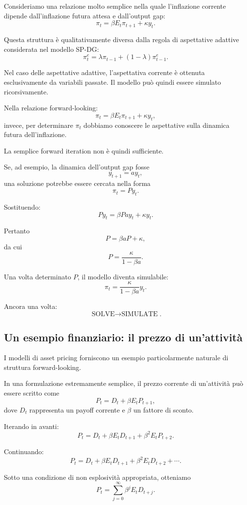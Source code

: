 \documentclass{book}
\begin{document}
Consideriamo una relazione molto semplice nella quale l'inflazione
corrente dipende dall'inflazione futura attesa e dall'output gap:
\[
\pi_t
=
\beta E_t\pi_{t+1}
+
\kappa y_t.
\]

Questa struttura è qualitativamente diversa dalla regola di aspettative
adattive considerata nel modello SP-DG:
\[
\pi_t^e
=
\lambda\pi_{t-1}
+
(1-\lambda)\pi_{t-1}^e.
\]

Nel caso delle aspettative adattive, l'aspettativa corrente è ottenuta
esclusivamente da variabili passate. Il modello può quindi essere
simulato ricorsivamente.

Nella relazione forward-looking:
\[
\pi_t
=
\beta E_t\pi_{t+1}
+
\kappa y_t,
\]
invece, per determinare $\pi_t$ dobbiamo conoscere le aspettative sulla
dinamica futura dell'inflazione.

La semplice forward iteration non è quindi sufficiente.

Se, ad esempio, la dinamica dell'output gap fosse
\[
y_{t+1}=a y_t,
\]
una soluzione potrebbe essere cercata nella forma
\[
\pi_t=P y_t.
\]

Sostituendo:
\[
P y_t
=
\beta P a y_t
+
\kappa y_t.
\]

Pertanto
\[
P
=
\beta aP+\kappa,
\]
da cui
\[
P
=
\frac{\kappa}{1-\beta a}.
\]

Una volta determinato $P$, il modello diventa simulabile:
\[
\pi_t
=
\frac{\kappa}{1-\beta a}y_t.
\]

Ancora una volta:
\[
\boxed{
\text{SOLVE}
\longrightarrow
\text{SIMULATE}
}.
\]


\subsection{Un esempio finanziario: il prezzo di un'attività}

I modelli di asset pricing forniscono un esempio particolarmente naturale
di struttura forward-looking.

In una formulazione estremamente semplice, il prezzo corrente di
un'attività può essere scritto come
\[
P_t
=
D_t+\beta E_tP_{t+1},
\]
dove $D_t$ rappresenta un payoff corrente e $\beta$ un fattore di sconto.

Iterando in avanti:
\[
P_t
=
D_t
+
\beta E_tD_{t+1}
+
\beta^2E_tP_{t+2}.
\]

Continuando:
\[
P_t
=
D_t
+
\beta E_tD_{t+1}
+
\beta^2E_tD_{t+2}
+
\cdots.
\]

Sotto una condizione di non esplosività appropriata, otteniamo
\[
P_t
=
\sum_{j=0}^{\infty}
\beta^j E_tD_{t+j}.
\]
\end{document}
